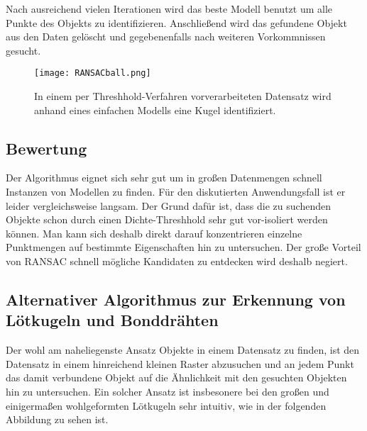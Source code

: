 Nach ausreichend vielen Iterationen wird das beste Modell benutzt um alle Punkte des Objekts zu identifizieren. Anschließend wird das gefundene Objekt aus den Daten gelöscht und gegebenenfalls nach weiteren Vorkommnissen gesucht.

\begin{figure}[H]
  \begin{center}
    \texttt{[image: RANSACball.png]}
    \caption{In einem per Threshhold-Verfahren vorverarbeiteten Datensatz wird anhand eines einfachen Modells eine Kugel identifiziert.}
    \label{fig:ransac2}
  \end{center}
\end{figure}

\subsection{Bewertung}
Der Algorithmus eignet sich sehr gut um in großen Datenmengen schnell Instanzen von Modellen zu finden. Für den diskutierten Anwendungsfall ist er leider vergleichsweise langsam. Der Grund dafür ist, dass die zu suchenden Objekte schon durch einen Dichte-Threshhold sehr gut vor-isoliert werden können. Man kann sich deshalb direkt darauf konzentrieren einzelne Punktmengen auf bestimmte Eigenschaften hin zu untersuchen. Der große Vorteil von RANSAC schnell mögliche Kandidaten zu entdecken wird deshalb negiert.

\subsection{Alternativer Algorithmus zur Erkennung von Lötkugeln und Bonddrähten}
Der wohl am naheliegenste Ansatz Objekte in einem Datensatz zu finden, ist den Datensatz in einem hinreichend kleinen Raster abzusuchen und an jedem Punkt das damit verbundene Objekt auf die Ähnlichkeit mit den gesuchten Objekten hin zu untersuchen.
Ein solcher Ansatz ist insbesonere bei den großen und einigermaßen wohlgeformten Lötkugeln sehr intuitiv, wie in der folgenden Abbildung zu sehen ist.


